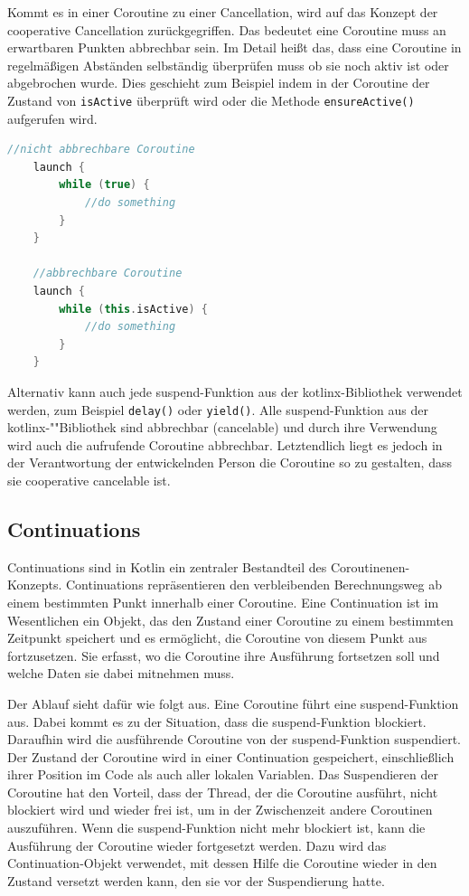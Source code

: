 \documentclass[fontsize=12pt,paper=a4,twoside=semi,parskip=half-,headsepline,headinclude]{scrreprt}
\begin{document}
Kommt es in einer Coroutine zu einer Cancellation, wird auf das Konzept der cooperative Cancellation\cite{Cancellation2024} zurückgegriffen. Das bedeutet eine Coroutine muss an erwartbaren Punkten abbrechbar sein. Im Detail heißt das, dass eine Coroutine in regelmäßigen Abständen selbständig überprüfen muss ob sie noch aktiv ist oder abgebrochen wurde. Dies geschieht zum Beispiel indem in der Coroutine der Zustand von \texttt{isActive} überprüft wird oder die Methode \texttt{ensureActive()} aufgerufen wird.

\begin{lstlisting}[language=Kotlin]
	//nicht abbrechbare Coroutine
	launch {
		while (true) {
			//do something
		}
	}

	//abbrechbare Coroutine
	launch {
		while (this.isActive) {
			//do something
		}
	}
\end{lstlisting}

Alternativ kann auch jede suspend-Funktion aus der kotlinx-Bibliothek verwendet werden, zum Beispiel \texttt{delay()} oder \texttt{yield()}. Alle suspend-Funktion aus der kotlinx-""Bibliothek sind abbrechbar (cancelable) und  durch ihre Verwendung wird auch die aufrufende Coroutine abbrechbar. Letztendlich liegt es jedoch in der Verantwortung der entwickelnden Person die Coroutine so zu gestalten, dass sie cooperative cancelable ist.

\subsection{Continuations}

Continuations sind in Kotlin ein zentraler Bestandteil des Coroutinenen-Konzepts. Continuations repräsentieren den verbleibenden Berechnungsweg ab einem bestimmten Punkt innerhalb einer Coroutine. Eine Continuation ist im Wesentlichen ein Objekt, das den Zustand einer Coroutine zu einem bestimmten Zeitpunkt speichert und es ermöglicht, die Coroutine von diesem Punkt aus fortzusetzen. Sie erfasst, wo die Coroutine ihre Ausführung fortsetzen soll und welche Daten sie dabei mitnehmen muss.

Der Ablauf sieht dafür wie folgt aus. Eine Coroutine führt eine suspend-Funktion aus. Dabei kommt es zu der Situation, dass die suspend-Funktion blockiert. Daraufhin wird die ausführende Coroutine von der suspend-Funktion suspendiert. Der Zustand der Coroutine wird in einer Continuation gespeichert, einschließlich ihrer Position im Code als auch aller lokalen Variablen. Das Suspendieren der Coroutine hat den Vorteil, dass der Thread, der die Coroutine ausführt, nicht blockiert wird und wieder frei ist, um in der Zwischenzeit andere Coroutinen auszuführen. Wenn die suspend-Funktion nicht mehr blockiert ist, kann die Ausführung der Coroutine wieder fortgesetzt werden. Dazu wird das Continuation-Objekt verwendet, mit dessen Hilfe die Coroutine wieder in den Zustand versetzt werden kann, den sie vor der Suspendierung hatte.
\end{document}
